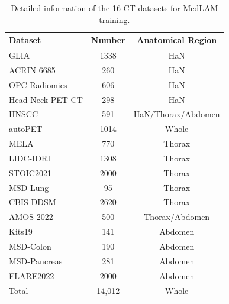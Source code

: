 \begin{table}[t!]
\caption{Detailed information of the 16 CT datasets for MedLAM training.}
\centering
\begin{tabular}{l|cc} 
\hline
Dataset          & Number       & Anatomical Region                    \\ \hline
GLIA \cite{bo2021toward}            & 1338         & HaN                           \\
ACRIN 6685\cite{lowe2019multicenter}       & 260          & HaN                           \\
OPC-Radiomics\cite{kwan2018radiomic}    & 606          & HaN                           \\
Head-Neck-PET-CT\cite{vallieres2017radiomics} & 298          & HaN                          \\
HNSCC \cite{grossberg2018imaging}           & 591          & HaN/Thorax/Abdomen     \\
autoPET \cite{gatidis2022whole}         & 1014         & Whole                       \\
MELA \cite{mela}          & 770          & Thorax                      \\
LIDC-IDRI\cite{armato2011lung}        & 1308         & Thorax                       \\
STOIC2021\cite{revel2021study}        & 2000         & Thorax                       \\
MSD-Lung\cite{antonelli2022medical}         & 95           & Thorax                      \\
CBIS-DDSM\cite{lee2017curated}        & 2620         & Thorax                      \\
AMOS 2022\cite{ji2022amos}        & 500          & Thorax/Abdomen             \\
Kits19\cite{heller2020state}           & 141          & Abdomen                     \\
MSD-Colon\cite{antonelli2022medical}        & 190          & Abdomen                     \\
MSD-Pancreas\cite{antonelli2022medical}     & 281          & Abdomen                      \\
FLARE2022\cite{ma2022fast}        & 2000         & Abdomen                      \\ \hline
Total            & 14,012       &  Whole                           \\ \hline
\end{tabular}
\label{tab:dataset}
\end{table}
